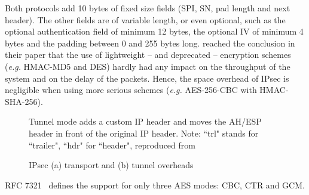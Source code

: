 Both protocols add 10 bytes of fixed size fields (SPI, SN, pad length and next header).
The other fields are of variable length, or even optional, such as the optional authentication field of minimum 12 bytes, the optional IV of minimum 4 bytes and the padding between 0 and 255 bytes long.
\citet{Xenakis20063225} reached the conclusion in their paper that the use of lightweight -- and deprecated -- encryption schemes (\textit{e.g.} HMAC-MD5 and DES) hardly had any impact on the throughput of the system and on the delay of the packets.
Hence, the space overhead of IPsec is negligible when using more serious schemes (\textit{e.g.} AES-256-CBC with HMAC-SHA-256).


\begin{figure}[ht]
\center
{}
\caption{IPsec (a) transport and (b) tunnel overheads}{Tunnel mode adds a custom IP header and moves the AH/ESP header in front of the original IP header. Note: ``trl" stands for ``trailer", ``hdr" for ``header", reproduced from~\cite{Xenakis20063225}}
\label{fig:ipsec-transport-tunnel}
\end{figure}

RFC 7321~\cite{rfc7321} defines the support for only three AES modes: CBC, CTR and GCM.





\newsavebox\myv

